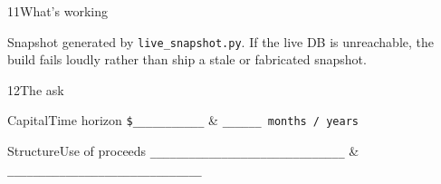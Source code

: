 \documentclass[10pt]{article}
\begin{document}
\begin{slide}{11}{What's working}
  \sliderule

  

  \vspace{0.2in}

  {\sffamily\fontsize{8pt}{10pt}\selectfont\color{amberdim}%
   Snapshot generated by \texttt{live\_snapshot.py}. If the live DB is
   unreachable, the build fails loudly rather than ship a stale or
   fabricated snapshot.}
\end{slide}

\begin{slide}{12}{The ask}
  \sliderule

  \begin{stack}{Capital}{Time horizon}
    \texttt{\$\_\_\_\_\_\_\_\_\_\_\_} &
    \texttt{\_\_\_\_\_\_ months / years} \\
  \end{stack}

  \vspace{0.3in}

  \begin{stack}{Structure}{Use of proceeds}
    \texttt{\_\_\_\_\_\_\_\_\_\_\_\_\_\_\_\_\_\_\_\_\_\_\_\_\_\_\_\_\_\_} &
    \texttt{\_\_\_\_\_\_\_\_\_\_\_\_\_\_\_\_\_\_\_\_\_\_\_\_\_\_\_\_\_\_} \\
  \end{stack}

  \vspace{0.3in}

\end{slide}
\end{document}
